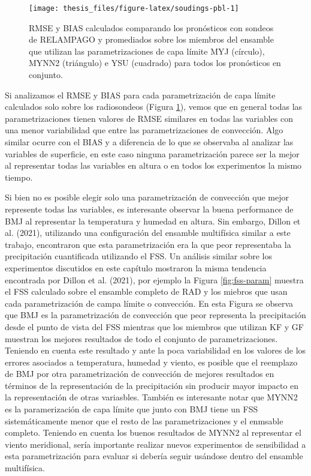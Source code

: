 \documentclass[12pt,oneside,a4paper]{reedthesis}
\begin{document}
\begin{figure}

{\centering \texttt{[image: thesis\_files/figure-latex/soudings-pbl-1]} 

}

\caption{RMSE y BIAS calculados comparando los pronósticos con sondeos de RELAMPAGO y promediados sobre los miembros del ensamble que utilizan las parametrizaciones de capa límite MYJ (círculo), MYNN2 (triángulo) e YSU (cuadrado) para todos los pronósticos en conjunto.}\label{fig:soudings-pbl}
\end{figure}
Si analizamos el RMSE y BIAS para cada parametrización de capa límite calculados solo sobre los radiosondeos (Figura \ref{fig:soudings-pbl}), vemos que en general todas las parametrizaciones tienen valores de RMSE similares en todas las variables con una menor variabilidad que entre las parametrizaciones de convección. Algo similar ocurre con el BIAS y a diferencia de lo que se observaba al analizar las variables de superficie, en este caso ninguna parametrización parece ser la mejor al representar todas las variables en altura o en todos los experimentos la mismo tiempo.

Si bien no es posible elegir solo una parametrización de convección que mejor represente todas las variables, es interesante observar la buena performance de BMJ al representar la temperatura y humedad en altura. Sin embargo, Dillon et al. (2021), utilizando una configuración del ensamble multifísica similar a este trabajo, encontraron que esta parametrización era la que peor representaba la precipitación cuantificada utilizando el FSS. Un análisis similar sobre los experimentos discutidos en este capítulo mostraron la misma tendencia encontrada por Dillon et al. (2021), por ejemplo la Figura \ref{fig:fss-param} muestra el FSS calculado sobre el ensamble completo de RAD y los miebros que usan cada parametrización de campa límite o convección. En esta Figura se observa que BMJ es la parametrización de convección que peor representa la precipitación desde el punto de vista del FSS mientras que los miembros que utilizan KF y GF muestran los mejores resultados de todo el conjunto de parametrizaciones. Teniendo en cuenta este resultado y ante la poca variabilidad en los valores de los errores asociados a temperatura, humedad y viento, es posible que el reemplazo de BMJ por otra parametrización de convección de mejores resultados en términos de la representación de la precipitación sin producir mayor impacto en la representación de otras variasbles. También es interesante notar que MYNN2 es la paramerización de capa límite que junto con BMJ tiene un FSS sistemáticamente menor que el resto de las parametrizaciones y el enmsable completo. Teniendo en cuenta los buenos resultados de MYNN2 al representar el viento meridional, sería importante realizar nuevos experimentos de sensibilidad a esta parametrización para evaluar si debería seguir usándose dentro del ensamble multifísica.
\end{document}

